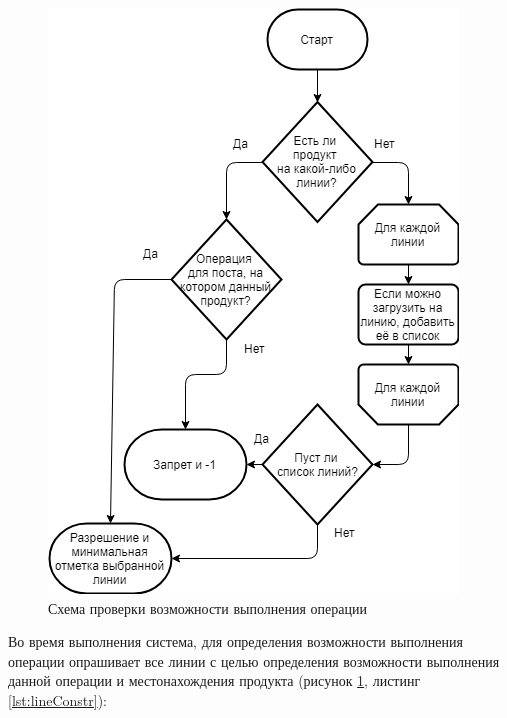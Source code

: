 \begin{figure}[ht]
	\centering
	\includegraphics[width=0.7\linewidth]{pics/assemblyConstrain.png}
	\caption{Схема проверки возможности выполнения операции}
	\label{fig:constrain}
\end{figure}

\indent Во время выполнения система, для определения возможности выполнения операции опрашивает все линии с целью определения возможности выполнения данной операции и местонахождения продукта (рисунок \ref{fig:constrain}, листинг \ref{lst:lineConstr}):

